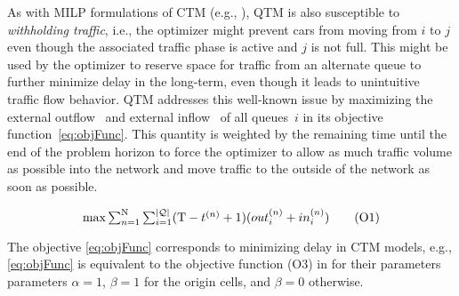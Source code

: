 As with MILP formulations of CTM (e.g., ), QTM is also
susceptible to \emph{withholding traffic}, i.e., the optimizer might prevent
cars from moving from $i$ to $j$ even though the associated traffic phase is
active and $j$ is not full.
%
This might be used by the optimizer to reserve space for traffic from an
alternate queue to further minimize delay in the long-term, even though it leads
to unintuitive traffic flow behavior.
%
QTM addresses this well-known issue by maximizing the external outflow~
%
%
and external inflow~ of all queues~$i$ in its objective
function~\eqref{eq:objFunc}.
%
This quantity is weighted by the remaining time until the end of the problem
horizon \TMAX to force the optimizer to allow as much traffic volume as possible
into the network and move traffic to the outside of the network as soon as
possible.

\vspace{-3mm}

\begin{equation}
\textstyle \max 
 \sum_{n=1}^{\mathrm{N}} \sum_{i=1}^{|\mathcal{\mathcal{Q}}|} (\mathrm{T} - t^{(n)} + 1) (out_{i}^{(n)} + in_{i}^{(n)})
\tag{O1}\label{eq:objFunc}
\end{equation}




The objective \eqref{eq:objFunc} corresponds to minimizing delay in CTM models,
e.g., \eqref{eq:objFunc} is equivalent to the objective function (O3) in
 for their parameters
parameters $\alpha = 1$, $\beta = 1$ for the origin cells, and
$\beta = 0$ otherwise.

